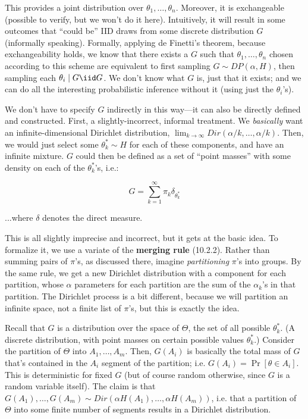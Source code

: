 This provides a joint distribution over $\theta_1, \ldots, \theta_n$. Moreover, it is exchangeable (possible to verify, but we won't do it here). Intuitively, it will result in some outcomes that ``could be'' IID draws from some discrete distribution $G$ (informally speaking). Formally, applying de Finetti's theorem, because exchangeability holds, we know that there exists a $G$ such that $\theta_1, \ldots, \theta_n$ chosen according to this scheme are equivalent to first sampling $G \sim DP(\alpha, H)$, then sampling each $\theta_i \mid G \iid G$. We don't know what $G$ is, just that it exists; and we can do all the interesting probabilistic inference without it (using just the $\theta_i$'s).

We don't have to specify $G$ indirectly in this way—it can also be directly defined and constructed. First, a slightly-incorrect, informal treatment. We \textit{basically} want an infinite-dimensional Dirichlet distribution, $\lim_{k \to \infty} Dir(\alpha/k, \ldots, \alpha/k)$. Then, we would just select some $\theta_k^* \sim H$ for each of these components, and have an infinite mixture. $G$ could then be defined as a set of ``point masses'' with some density on each of the $\theta_k^*$'s, i.e.:

$$G = \sum_{k = 1}^\infty \pi_k \delta_{\theta_k^*}$$

...where $\delta$ denotes the direct measure. 

This is all slightly imprecise and incorrect, but it gets at the basic idea. To formalize it, we use a variate of the \textbf{merging rule} (10.2.2). Rather than summing pairs of $\pi$'s, as discussed there, imagine \textit{partitioning} $\pi$'s into groups. By the same rule, we get a new Dirichlet distribution with a component for each partition, whose $\alpha$ parameters for each partition are the sum of the $\alpha_k$'s in that partition. The Dirichlet process is a bit different, because we will partition an infinite space, not a finite list of $\pi$'s, but this is exactly the idea.

Recall that $G$ is a distribution over the space of $\Theta$, the set of all possible $\theta_k^*$. (A discrete distribution, with point masses on certain possible values $\theta_k^*$.) Consider the partition of $\Theta$ into $A_1, \ldots, A_m$. Then, $G(A_i)$ is basically the total mass of $G$ that's contained in the $A_i$ segment of the partition; i.e. $G(A_i) = \Pr[\theta \in A_i]$. This is deterministic for fixed $G$ (but of course random otherwise, since $G$ is a random variable itself). The claim is that $G(A_1), \ldots, G(A_m) \sim Dir(\alpha H(A_1), \ldots, \alpha H(A_m))$, i.e. that a partition of $\Theta$ into some finite number of segments results in a Dirichlet distribution.

